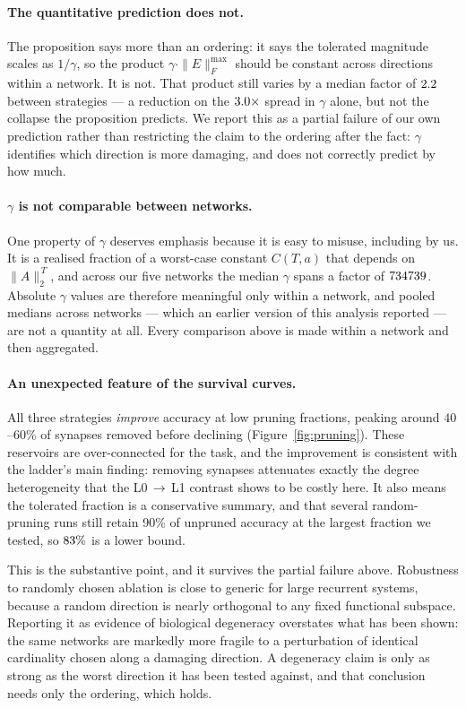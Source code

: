 \paragraph{The quantitative prediction does not.}
The proposition says more than an ordering: it says the tolerated magnitude scales as
$1/\gamma$, so the product $\gamma \cdot \|E\|_F^{\max}$ should be constant across
directions within a network. It is not. That product still varies by a median factor of
$2.2$ between strategies --- a reduction on the $3.0\times$
spread in $\gamma$ alone, but not the collapse the proposition predicts. We report this
as a partial failure of our own prediction rather than restricting the claim to the
ordering after the fact: $\gamma$ identifies which direction is more damaging, and does
not correctly predict by how much.

\paragraph{$\gamma$ is not comparable between networks.}
One property of $\gamma$ deserves emphasis because it is easy to misuse, including by
us. It is a realised fraction of a worst-case constant $C(T,a)$ that depends on
$\|A\|_2^{\,T}$, and across our five networks the median $\gamma$ spans a factor of
$734739$. Absolute $\gamma$ values are therefore meaningful only
within a network, and pooled medians across networks --- which an earlier version of
this analysis reported --- are not a quantity at all. Every comparison above is made
within a network and then aggregated.

\paragraph{An unexpected feature of the survival curves.}
All three strategies \emph{improve} accuracy at low pruning fractions, peaking around
$40$--$60\%$ of synapses removed before declining (Figure~\ref{fig:pruning}). These
reservoirs are over-connected for the task, and the improvement is consistent with the
ladder's main finding: removing synapses attenuates exactly the degree heterogeneity
that the L0\,$\rightarrow$\,L1 contrast shows to be costly here. It also means the
tolerated fraction is a conservative summary, and that several random-pruning runs still
retain 90\% of unpruned accuracy at the largest fraction we tested, so $83\%$ is
a lower bound.

This is the substantive point, and it survives the partial failure above. Robustness to
randomly chosen ablation is close to generic for large recurrent systems, because a
random direction is nearly orthogonal to any fixed functional subspace. Reporting it as
evidence of biological degeneracy overstates what has been shown: the same networks are
markedly more fragile to a perturbation of identical cardinality chosen along a damaging
direction. A degeneracy claim is only as strong as the worst direction it has been
tested against, and that conclusion needs only the ordering, which holds.

